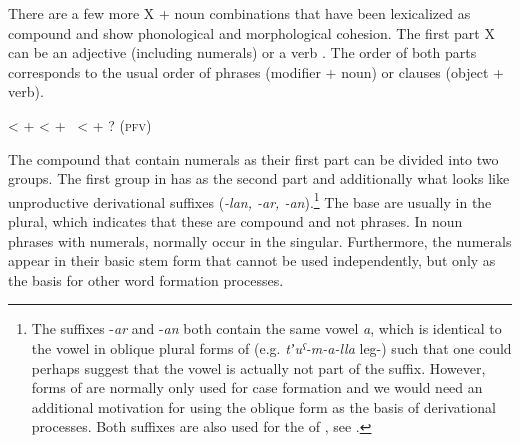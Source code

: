 There are a few more X + noun combinations that have been lexicalized as compound  and show phonological and morphological cohesion. The first part X can be an adjective (including numerals) or a verb . The order of both parts corresponds to the usual order of phrases (modifier + noun) or clauses (object + verb). 


%
\begin{exe}
	\ex	\label{ex:χːulabamother-in-law} 
	\begin{xlist}
		\TabPositions{10em,12em}
		\ex	{}			\tab	<	\tab	 {}  +  
		\ex	{}			\tab	<	\tab	 {}  +  
	\ex	{} 
		\sn	~\hspace{2em}<\hspace{1em}	  + ?   (\textsc{pfv})	
	\end{xlist}
\end{exe}	

%

The compound  that contain numerals as their first part can be divided into two groups. The first group in  has  as the second part and additionally what looks like unproductive derivational suffixes (\textit{-lan, -ar, -an}).\footnote{The suffixes -\textit{ar} and -\textit{an} both contain the same vowel \textit{a}, which is identical to the vowel in oblique plural forms of  (e.g. \textit{tʼuˁ-m-a-lla} leg-) such that one could perhaps suggest that the vowel is actually not part of the suffix. However,  forms of  are normally only used for case formation and we would need an additional motivation for using the oblique form as the basis of derivational processes. Both suffixes are also used for the  of , see .} The base  are usually in the plural, which indicates that these are compound  and not phrases. In noun phrases with numerals,  normally occur in the singular. Furthermore, the numerals appear in their basic stem form that cannot be used independently, but only as the basis for other word formation processes. 

